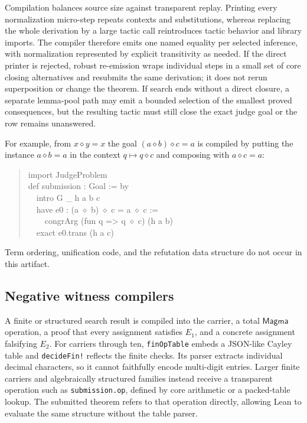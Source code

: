\documentclass[10pt,twocolumn]{article}
\newcommand{\op}{\mathbin{\diamond}}
\newcommand{\code}[1]{\texttt{#1}}
\begin{document}
Compilation balances source size against transparent replay.  Printing every
normalization micro-step repeats contexts and substitutions, whereas replacing
the whole derivation by a large tactic call reintroduces tactic behavior and
library imports.  The compiler therefore emits one named equality per selected
inference, with normalization represented by explicit transitivity as needed.
If the direct printer is rejected, robust re-emission wraps individual steps in
a small set of core closing alternatives and resubmits the same derivation; it
does not rerun superposition or change the theorem.  If search ends without a
direct closure, a separate lemma-pool path may emit a bounded selection of the
smallest proved consequences, but the resulting tactic must still close the
exact judge goal or the row remains unanswered.

For example, from $x\op y=x$ the goal $(a\op b)\op c=a$ is compiled by putting
the instance $a\op b=a$ in the context $q\mapsto q\op c$ and composing with
$a\op c=a$:
\begin{quote}
\small\ttfamily
import JudgeProblem\\
def submission : Goal := by\\
\ \ intro G \_ h a b c\\
\ \ have e0 : (a $\diamond$ b) $\diamond$ c = a $\diamond$ c :=\\
\ \ \ \ congrArg (fun q => q $\diamond$ c) (h a b)\\
\ \ exact e0.trans (h a c)
\end{quote}
Term ordering, unification code, and the refutation data structure do not occur
in this artifact.

\subsection{Negative witness compilers}

A finite or structured search result is compiled into the carrier, a total
$\mathsf{Magma}$ operation, a proof that every assignment satisfies $E_1$, and a
concrete assignment falsifying $E_2$.  For carriers through ten,
\code{finOpTable} embeds a JSON-like Cayley table and \code{decideFin!}
reflects the finite checks.  Its parser extracts individual decimal
characters, so it cannot faithfully encode multi-digit entries.  Larger
finite carriers and algebraically structured families instead receive a
transparent operation such as \code{submission.op}, defined by core arithmetic
or a packed-table lookup.  The submitted theorem refers to that operation
directly, allowing Lean to evaluate the same structure without the table
parser.
\end{document}
